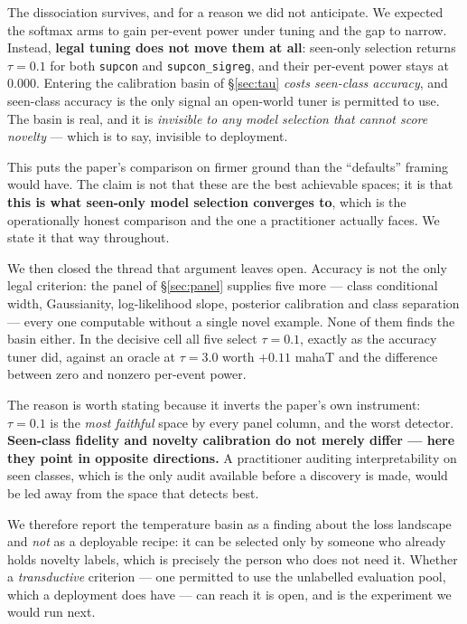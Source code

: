 \documentclass{article}
\begin{document}
The dissociation survives, and for a reason we did not anticipate. We expected
the softmax arms to gain per-event power under tuning and the gap to narrow.
Instead, \textbf{legal tuning does not move them at all}: seen-only selection
returns $\tau=0.1$ for both \texttt{supcon} and \texttt{supcon\_sigreg}, and
their per-event power stays at $0.000$. Entering the calibration basin of
\S\ref{sec:tau} \emph{costs seen-class accuracy}, and seen-class accuracy is the
only signal an open-world tuner is permitted to use. The basin is real, and it
is \emph{invisible to any model selection that cannot score novelty} --- which
is to say, invisible to deployment.

This puts the paper's comparison on firmer ground than the ``defaults'' framing
would have. The claim is not that these are the best achievable spaces; it is
that \textbf{this is what seen-only model selection converges to}, which is the
operationally honest comparison and the one a practitioner actually faces. We
state it that way throughout.

We then closed the thread that argument leaves open. Accuracy is not the only
legal criterion: the panel of \S\ref{sec:panel} supplies five more --- class
conditional width, Gaussianity, log-likelihood slope, posterior calibration and
class separation --- every one computable without a single novel example. None
of them finds the basin either. In the decisive cell all five select
$\tau=0.1$, exactly as the accuracy tuner did, against an oracle at $\tau=3.0$
worth $+0.11$ mahaT and the difference between zero and nonzero per-event power.

The reason is worth stating because it inverts the paper's own instrument:
$\tau=0.1$ is the \emph{most faithful} space by every panel column, and the
worst detector. \textbf{Seen-class fidelity and novelty calibration do not
merely differ --- here they point in opposite directions.} A practitioner
auditing interpretability on seen classes, which is the only audit available
before a discovery is made, would be led away from the space that detects best.

We therefore report the temperature basin as a finding about the loss
landscape and \emph{not} as a deployable recipe: it can be selected only by
someone who already holds novelty labels, which is precisely the person who
does not need it. Whether a \emph{transductive} criterion --- one permitted to
use the unlabelled evaluation pool, which a deployment does have --- can reach
it is open, and is the experiment we would run next.
\end{document}
